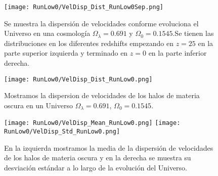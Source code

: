 \begin{figure}[H]
    \centering
    \texttt{[image: RunLow0/VelDisp\_Dist\_RunLow0Sep.png]}
    \caption[Dispersión de velocidades en la evolución de un Universo $\Omega_\lambda = 0.691$, $\Omega_0 = 0.1545$]{\footnotesize Se muestra la dispersión de velocidades conforme evoluciona el Universo en una cosmología $\Omega_\lambda = 0.691$ y $\Omega_0 = 0.1545$.Se tienen las distribuciones en los diferentes redshifts empezando en $z=25$ en la parte superior izquierda y terminado en $z=0$ en la parte inferior derecha.}
    \label{fig:Low0-VelDispDistSep}
\end{figure}

\begin{figure}[H]
    \centering
    \texttt{[image: RunLow0/VelDisp\_Dist\_RunLow0.png]}
    \caption[Distribución de la dispersión de velocidades de un Universo $\Omega_\lambda = 0.691$, $\Omega_0 = 0.1545$]{\footnotesize Mostramos la dispersion de velocidades de los halos de materia oscura en un Universo $\Omega_\lambda = 0.691$, $\Omega_0 = 0.1545$.}
    \label{fig:Low0-VelDispDist}
\end{figure}

\begin{figure}[H]
    \centering
    \texttt{[image: RunLow0/VelDisp\_Mean\_RunLow0.png]}
    \texttt{[image: RunLow0/VelDisp\_Std\_RunLow0.png]}
    \caption[Media y desviación estándar de la dispersión de velocidades de un Universo $\Omega_\lambda = 0.691$, $\Omega_0 = 0.1545$]{\footnotesize En la izquierda mostramos la media de la dispersión de velocidades de los halos de materia oscura y en la derecha se muestra su desviación estándar a lo largo de la evolución del Universo.}
    \label{fig:Low0-VelDispStats}
\end{figure}

